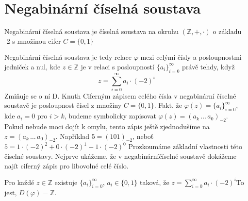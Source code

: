 \documentclass[czech,bachelor,dept470,male]{diploma}
\newcommand{\posla}{\{a_i\}_{i=0}^{\infty}}
\begin{document}
\section{Negabinární číselná soustava}
\begin{definition}
	Negabinární číselná soustava je číselná soustava na okruhu $(\mathbb{Z},+,\cdot)$ o základu -2 s množinou cifer $C=\{0,1\}$
\end{definition}
Negabinární číselná soustava je tedy relace $\varphi$ mezi celými čísly a posloupnostmi jedniček a nul, kde $z \in \mathbb{Z}$ je v relaci s posloupností $\posla$ právě tehdy, když
$$z=\sum_{i=0}^{\infty}a_i\cdot(-2)^i$$
Zmiňuje se o ní D. Knuth \cite{pcProg}
Ciferným zápisem celého čísla v negabinární číselné soustavě je posloupnost čísel z množiny $C=\{0,1\}$. Fakt, že $\varphi(z) = \posla$, kde $a_i = 0$ pro $i > k$, budeme symbolicky zapisovat $\varphi(z) = (a_k\,\dots\, a_0)_{-2}$. Pokud nebude moci dojít k omylu, tento zápis ještě zjednodušíme na $z = (a_k\,\dots\, a_0)_{-2}$. Například $5 = (101)_{-2}$, neboť $5 = 1\cdot(-2)^2 + 0\cdot(-2)^1 + 1\cdot(-2)^0$\newline
Prozkoumáme základní vlastnosti této číselné soustavy. Nejprve ukážeme, že v negabinární\newline číselné soustavě dokážeme najít ciferný zápis pro libovolné celé číslo.
\begin{theorem}\label{negaDF}
	Pro každé $z \in \mathbb{Z}$ existuje $\posla$, $a_i\in \{0,1\}$ taková, že
	$z=\sum_{i=0}^{\infty}a_i\cdot(-2)^i$\newline To jest, $D(\varphi)=\mathbb{Z}$.
\end{theorem}
\end{document}
